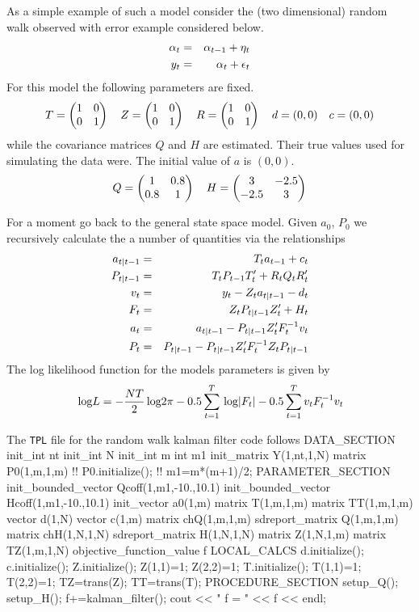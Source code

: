 As a simple example of such a model consider the (two dimensional)
random walk observed with error example considered below.
 \begin{eqnarray}
   \alpha_t&=&\alpha_{t-1}+\eta_t\cr
   y_t&=&\alpha_t+\epsilon_t\cr
 \end{eqnarray}
For this model  the following parameters are fixed.
$$ T=\left(\begin{matrix}1 & 0\\
                    0 & 1 \end{matrix}\right) 
  \quad
   Z=\left(\begin{matrix}1 & 0\cr
                    0 & 1 \end{matrix}\right) 
  \quad
   R=\left(\begin{matrix}1 & 0\cr
                    0 & 1\end{matrix}\right) 
  \quad
  d=(0,0)
  \quad
  c=(0,0)
$$
while the covariance matrices $Q$ and $H$ are estimated. Their
true values used for simulating the data were. The initial
value of $a$ is $(0,0)$.
$$
   Q=\left(\begin{matrix}1 & 0.8\cr
                   0.8 & 1 \end{matrix}\right)
  \quad
   H=\left(\begin{matrix}3 & -2.5\cr
                   -2.5 & 3 \end{matrix}\right)
$$
 
For a moment go back to the general state space model.
Given $a_0$, $P_0$ we recursively calculate the a number of quantities
via the relationships
 \begin{eqnarray}
      \aone&=&T_ta_{t-1}+c_t\cr
      \Pone&=&T_tP_{t-1}T^\prime_t +R_tQ_tR^\prime_t\cr
      v_t&=&y_t-Z_t\aone-d_t\cr
      F_t&=&Z_t\Pone Z_t^\prime+H_t\cr
      a_t&=&\aone-\Pone Z_t^\prime F_t^{-1}v_t\cr
      P_t&=&\Pone-\Pone Z_t^\prime F_t^{-1}Z_t\Pone
 \end{eqnarray}
The log likelihood function for the models parameters is
given by
$$\log L = -{NT\over 2}\log 2\pi -0.5 \sum_{t=1}^T \log|F_t|
        -0.5 \sum_{t=1}^T v_t F_t^{-1} v_t$$

The {\tt TPL} file for the random walk kalman filter code
follows
\beginexample
DATA_SECTION
  init_int nt
  init_int N
  init_int m
  int m1
  init_matrix Y(1,nt,1,N)
  matrix P0(1,m,1,m)
 !! P0.initialize(); 
 !! m1=m*(m+1)/2; 
PARAMETER_SECTION
  init_bounded_vector Qcoff(1,m1,-10.,10.1)
  init_bounded_vector Hcoff(1,m1,-10.,10.1)
  init_vector a0(1,m)
  matrix T(1,m,1,m)
  matrix TT(1,m,1,m)
  vector d(1,N)
  vector c(1,m)
  matrix chQ(1,m,1,m)
  sdreport_matrix Q(1,m,1,m)
  matrix chH(1,N,1,N)
  sdreport_matrix H(1,N,1,N)
  matrix Z(1,N,1,m)
  matrix TZ(1,m,1,N)
  objective_function_value f
 LOCAL_CALCS
   d.initialize();
   c.initialize();
   Z.initialize();
   Z(1,1)=1; Z(2,2)=1;
   T.initialize();
   T(1,1)=1; T(2,2)=1;
   TZ=trans(Z);
   TT=trans(T);
PROCEDURE_SECTION
  setup_Q();
  setup_H();
  f+=kalman_filter();
  cout << " f = " << f << endl;

